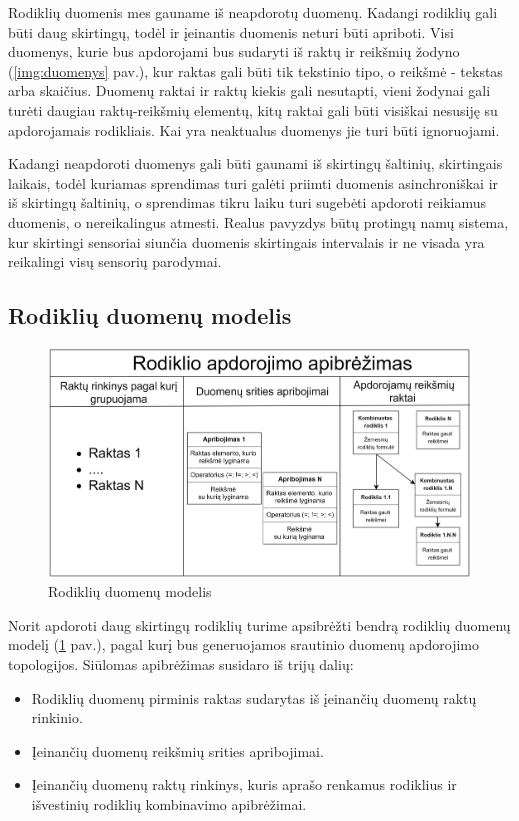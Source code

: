 \documentclass{VUMIFPSbakalaurinis}
\begin{document}
Rodiklių duomenis mes gauname iš neapdorotų duomenų. Kadangi rodiklių gali būti daug skirtingų, todėl ir įeinantis duomenis neturi būti apriboti. Visi duomenys, kurie bus apdorojami bus sudaryti iš raktų ir reikšmių žodyno (\ref{img:duomenys} pav.), kur raktas gali būti tik tekstinio tipo, o reikšmė - tekstas arba skaičius. Duomenų raktai ir raktų kiekis gali nesutapti, vieni žodynai gali turėti daugiau raktų-reikšmių elementų, kitų raktai gali būti visiškai nesusiję su apdorojamais rodikliais. Kai yra neaktualus duomenys jie turi būti ignoruojami.\par 
Kadangi neapdoroti duomenys gali būti gaunami iš skirtingų šaltinių, skirtingais laikais, todėl kuriamas sprendimas turi galėti priimti duomenis asinchroniškai ir iš skirtingų šaltinių, o sprendimas tikru laiku turi sugebėti apdoroti reikiamus duomenis, o nereikalingus atmesti. Realus pavyzdys būtų protingų namų sistema, kur skirtingi sensoriai siunčia duomenis skirtingais intervalais ir ne visada yra reikalingi visų sensorių parodymai.  

\subsection{Rodiklių duomenų modelis}

\begin{figure}[H]
    \includegraphics[width=1\textwidth]{img/rodiklio_apibrezimas.png}
    \caption{Rodiklių duomenų modelis}
    \label{img:rodiklio_apibrezimas}
\end{figure}

Norit apdoroti daug skirtingų rodiklių turime apsibrėžti bendrą rodiklių duomenų modelį (\ref{img:rodiklio_apibrezimas} pav.), pagal kurį bus generuojamos srautinio duomenų apdorojimo topologijos. Siūlomas apibrėžimas susidaro iš trijų dalių: 
\begin{itemize}
    \item Rodiklių duomenų pirminis raktas sudarytas iš įeinančių duomenų raktų rinkinio.
    \item Įeinančių duomenų reikšmių srities apribojimai.
    \item Įeinančių duomenų raktų rinkinys, kuris aprašo renkamus rodiklius ir išvestinių rodiklių kombinavimo apibrėžimai. 
\end{itemize}
\end{document}
